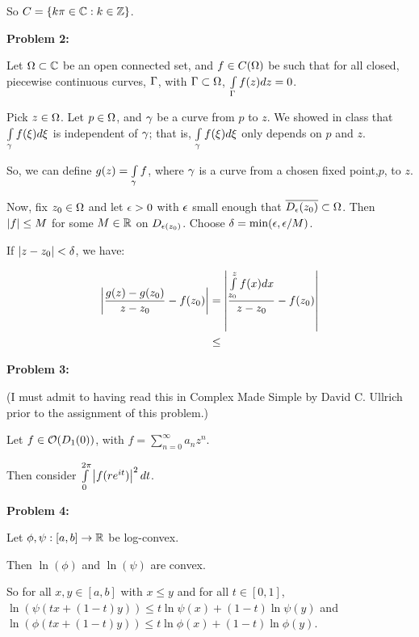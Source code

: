 \documentclass[a4paper,12pt]{article}
\begin{document}
So $C = \{k\pi  \in \mathbb{C}: k \in \mathbb{Z}\}$.

\shunt

{\bf Problem 2:}

Let $\Omega \subset \mathbb{C}$ be an open connected set, and $f \in C(\Omega)$ be such that for all closed, piecewise continuous curves, $\Gamma$, with $\Gamma \subset \Omega$, $\int\limits_\Gamma f(z) dz = 0$.

Pick $z \in \Omega$. Let $p \in \Omega$, and $\gamma$ be a curve from $p$ to $z$. We showed in class that $\int\limits_\gamma f(\xi) d\xi$ is independent of $\gamma$; that is, $\int\limits_\gamma f(\xi) d\xi$ only depends on $p$ and $z$.

So, we can define $g(z) = \int\limits_\gamma f$, where $\gamma$ is a curve from a chosen fixed point,$p$, to $z$.

Now, fix $z_0 \in \Omega$ and let $\epsilon >0$ with $\epsilon$ small enough that $\overline{D_\epsilon(z_0)} \subset \Omega$. Then $\left\lvert f \right\rvert \leq M$ for some $M \in \mathbb{R}$ on $D_{\epsilon(z_0)}$. Choose $\delta = \min(\epsilon, \epsilon/M)$.

\tab If $\left\lvert z-z_0 \right\rvert < \delta$, we have:

\begin{align*}
\left\lvert \frac{g(z)-g(z_0)}{z-z_0} -f(z_0) \right\rvert &= \left\lvert \frac{\int\limits_{z_0}^z f(x) dx}{z-z_0} -f(z_0) \right\rvert\\
&\leq \\
\end{align*}



\shunt

{\bf Problem 3:}

(I must admit to having read this in Complex Made Simple by David C. Ullrich prior to the assignment of this problem.)

Let $f \in \mathcal{O}(D_1(0))$, with $f = \sum\limits_{n=0}^\infty a_nz^n$.

Then consider $\int\limits_0^{2\pi} \left\lvert f(re^{it}) \right\rvert^2 dt$. %

\shunt

{\bf Problem 4:}

Let $\phi, \psi : [a,b] \to \mathbb{R}$ be log-convex.

Then $\ln(\phi)$ and $\ln(\psi)$ are convex.

So for all $x,y \in [a,b]$ with $x \leq y$ and for all $t \in [0,1]$, $\ln(\psi(tx+(1-t)y)) \leq t\ln\psi(x) + (1-t)\ln\psi(y)$ and $\ln(\phi(tx+(1-t)y)) \leq t\ln\phi(x) + (1-t)\ln\phi(y)$.
\end{document}
